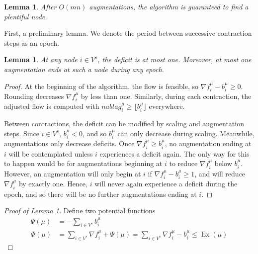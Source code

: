 \documentclass[11pt]{article}
\newtheorem{lemma}[theorem]{Lemma}
\theoremstyle{definition}
\theoremstyle{definition}
\newcommand{\fu}{f^{\mu}}
\newcommand{\nfiu}{\nabla \fu_i}
\newcommand{\biu}{b_{i}^{\mu}}
\newcommand{\vsrc}{V^{s}}
\DeclareMathOperator{\Ex}{Ex}
\newcommand{\todo}[1]{}%
\begin{document}
    \begin{lemma} \label{lem.num-aug}
        After $O(mn)$ augmentations, the algorithm is guaranteed to find a plentiful node.
    \end{lemma}
    First, a preliminary lemma. We denote the period between successive contraction
    steps as an epoch.
    \begin{lemma}
    At any node $i \in \vsrc$, the deficit is at most one. Moreover, at most one augmentation
    ends at such a node during any epoch.
    \end{lemma}
    \begin{proof}
        At the beginning of the algorithm, the flow is feasible, so $\nfiu - \biu \geq 0$.
        Rounding decreases $\nfiu$ by less than one. Similarly, during each contraction,
        the adjusted flow is computed with $nabla g_i^\mu \geq \lfloor \biu \rfloor$ everywhere.

        Between contractions, the deficit can be modified by scaling and augmentation steps.
        Since $i \in \vsrc$, $\biu < 0$, and so $\biu$ can only decrease during scaling.
        Meanwhile, augmentations only decrease deficits.
        Once $\nfiu \geq \biu$, no augmentation ending at $i$ will be contemplated unless $i$
        experiences a deficit again. The only way for this to happen would be for
        augmentations beginning at $i$ to reduce $\nfiu$ below $\biu$. However,
        an augmentation will only begin at $i$ if
        $\nfiu - \biu \geq 1$, and will reduce $\nfiu$ by exactly one. Hence, $i$ will
        never again experience a deficit during the epoch, and so there will be no further
        augmentations ending at $i$.
    \end{proof}

    \begin{proof}[Proof of Lemma \ref{lem.num-aug}]
    Define two potential functions
    \begin{align*}
    \Psi(\mu) &= - \sum_{i \in \vsrc} \biu \\
    \Phi(\mu) &= \sum_{i \in \vsrc} \nfiu + \Psi(\mu) = \sum_{i \in \vsrc} \nfiu - \biu
               \leq \Ex(\mu)
    \end{align*}
    \todo{complete proof}
    \end{proof}





\setlength{\bibitemsep}{0pt}
\nocite{*}
\printbibliography
\end{document}
